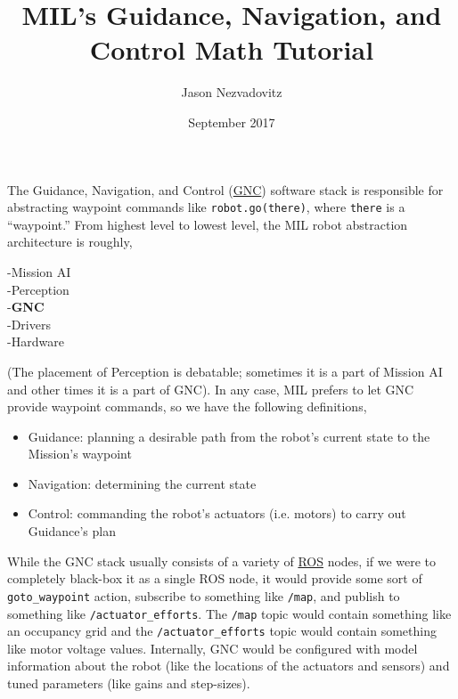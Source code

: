 \documentclass{article}
\newcommand\tab[1][1cm]{\hspace*{#1}}
\def\code#1{\texttt{#1}}
\begin{document}

\title{MIL's Guidance, Navigation, and Control Math Tutorial}
\author{Jason Nezvadovitz}
\date{September 2017}
\maketitle


The Guidance, Navigation, and Control (\href{https://en.wikipedia.org/wiki/Guidance,_navigation,_and_control}{GNC}) software stack is responsible for abstracting waypoint commands like \code{robot.go(there)}, where \code{there} is a ``waypoint.'' From highest level to lowest level, the MIL robot abstraction architecture is roughly,
\begin{center}
  -Mission AI\\
  \tab -Perception\\
  \tab -\textbf{GNC}\\
  \tab\tab -Drivers\\
  \tab\tab\tab -Hardware\\
\end{center}

(The placement of Perception is debatable; sometimes it is a part of Mission AI and other times it is a part of GNC). In any case, MIL prefers to let GNC provide waypoint commands, so we have the following definitions,
\begin{itemize}
  \item Guidance: planning a desirable path from the robot's current state to the Mission's waypoint
  \item Navigation: determining the current state
  \item Control: commanding the robot's actuators (i.e. motors) to carry out Guidance's plan
\end{itemize}\smallskip

While the GNC stack usually consists of a variety of \href{http://www.ros.org/}{ROS} nodes, if we were to completely black-box it as a single ROS node, it would provide some sort of \code{goto\_waypoint} action, subscribe to something like \code{/map}, and publish to something like \code{/actuator\_efforts}. The \code{/map} topic would contain something like an occupancy grid and the \code{/actuator\_efforts} topic would contain something like motor voltage values. Internally, GNC would be configured with model information about the robot (like the locations of the actuators and sensors) and tuned parameters (like gains and step-sizes).\\
\end{document}
